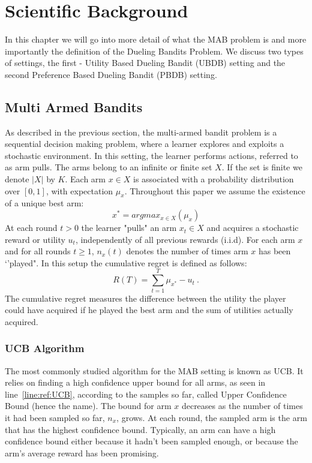 \documentclass[MSc,beforeExam]{iitcsthesis}
\begin{document}
\chapter{Scientific Background}

In this chapter we will go into more detail of what the MAB problem is and more importantly the definition of the Dueling Bandits Problem. 
	We discuss two types of settings, the first - Utility Based Dueling Bandit (UBDB) setting and the second Preference Based Dueling Bandit (PBDB) setting.
	\section{Multi Armed Bandits}
	As described in the previous section, the multi-armed bandit problem is a sequential decision making problem, where a learner explores and exploits a stochastic environment. 
	In this setting, the learner performs actions, referred to as arm pulls.
	The arms belong to an infinite or finite set $X$.
	If the set is finite we denote $|X|$ by $K$.
	Each arm $x \in X$ is associated with a probability distribution over $[0, 1]$, with expectation $\mu_{x}$. 
	Throughout this paper we assume the existence of a unique best arm:
	\begin{equation}\label{eq:regret}
		x^* = argmax_{x \in X}(\mu_{x})
	\end{equation}
	At each round $t > 0$ the learner "pulls" an arm $x_t \in X$ and acquires a stochastic reward or utility $u_t$, independently of all previous rewards (i.i.d). 
	For each arm $x$ and for all rounds $t \geq 1$, $n_{x}(t)$ denotes the number of times arm $x$ has been `'played".
	In this setup the cumulative regret is defined as follows:
	\begin{equation}\label{eq:regret}
		R(T) = \sum_{t=1}^{T} \mu_{x^*} - u_t\ .
	\end{equation}
	The cumulative regret measures the difference between the utility the player could have acquired if he played the best arm and the sum of utilities actually acquired.

\subsection{UCB Algorithm}
	The most commonly studied algorithm for the MAB setting \cite{auer2002finite, auer2010ucb} is known as UCB. %
	It relies on finding a high confidence upper bound for all arms, as seen in line~\ref{line:ref:UCB}, according to the samples so far, called Upper Confidence Bound (hence the name). 
	The bound for arm $x$ decreases as the number of times it had been sampled so far, $n_x$, grows.
	At each round, the sampled arm is the arm that has the highest confidence bound.  Typically, an arm can have a high confidence bound either because it hadn't been sampled enough, or because the arm's average reward has been promising.
	
\end{document}
